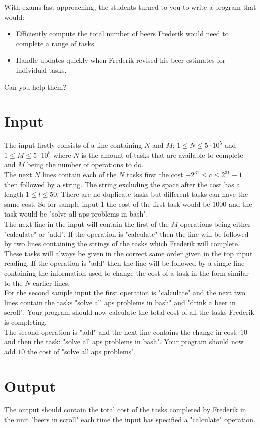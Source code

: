 With exams fast approaching, the students turned to you to write a program that would:
\begin{itemize}
    \item Efficiently compute the total number of beers Frederik would need to complete a range of tasks.
    \item Handle updates quickly when Frederik revised his beer estimates for individual tasks.
\end{itemize}
Can you help them?


\section*{Input}
The input firstly consists of a line containing $N$ and $M$: $1 \leq N \leq 5 \cdot 10^5$ and $1 \leq M \leq 5 \cdot 10^5$ where $N$ is the amount of tasks that are available to complete and $M$ being the number of operations to do. \\
The next $N$ lines contain each of the $N$ tasks first the cost $-2^{31} \leq c \leq 2^{31} - 1$ then followed by a string. The string excluding the space after the cost has a length $1 \leq l \leq 50$. There are no duplicate tasks but different tasks can have the same cost. So for sample input 1 the cost of the first task would be $1000$ and the task would be "solve all aps problems in bash". \\
The next line in the input will contain the first of the $M$ operations being either "calculate" or "add". If the operation is "calculate" then the line will be followed by two lines containing the strings of the tasks which Frederik will complete. These tasks will always be given in the correct same order given in the top input reading. If the operation is "add" then the line will be followed by a single line containing the information used to change the cost of a task in the form similar to the $N$ earlier lines. \\
For the second sample input the first operation is "calculate" and the next two lines contain the tasks "solve all aps problems in bash" and "drink a beer in scroll". Your program should now calculate the total cost of all the tasks Frederik is completing.\\
The second operation is "add" and the next line contains the change in cost: $10$ and then the task: "solve all aps problems in bash". Your program should now add $10$ the cost of "solve all aps problems".

\section*{Output}
The output should contain the total cost of the tasks completed by Frederik in the unit "beers in scroll" each time the input has specified a "calculate" operation.
